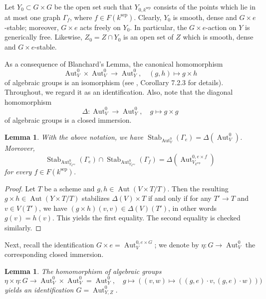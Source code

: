 \documentclass[oneside, 12pt]{amsart}
\newtheorem{lemma}[theorem]{Lemma}
\theoremstyle{definition}
\theoremstyle{remark}
\newcommand{\Aut}{\operatorname{Aut}}
\newcommand{\ra}{\rightarrow}
\newcommand{\sep}{{\operatorname{sep}}}
\newcommand{\Stab}{\operatorname{Stab}}
\begin{document}
Let $Y_0 \subset G \times G$ be the
open set such that $Y_{0,k^{\sep}}$ consists 
of the points which lie in at most one graph 
$\Gamma_f$, where $f \in F(k^{\sep})$. Clearly,
$Y_0$ is smooth, dense and $G \times e$-stable;
moreover, $G \times e$ acts freely on $Y_0$.
In particular, the $G \times e$-action on $Y$
is generically free. Likewise, 
$Z_0 = Z \cap Y_0$ is an open set of $Z$ which
is smooth, dense and $G\times e$-stable.

 
As a consequence of Blanchard's Lemma, the canonical 
homomorphism 
\[ \Aut^0_V \times \Aut^0_V 
\longrightarrow \Aut^0_Y, 
\quad (g,h) \longmapsto g \times h \]
of algebraic groups is an isomorphism
(see \cite{Brion 2017}, Corollary 7.2.3 for details). 
Throughout, we regard it as an identification.
Also, note that the diagonal homomorphism
\[ \Delta : 
\Aut^0_V \longrightarrow \Aut^0_Y, 
 \quad g \longmapsto  g \times g \]
 of algebraic groups is a closed immersion.

\begin{lemma}\label{lem:diag} 
With the above notation, we have
$\Stab_{\Aut^0_Y}(\Gamma_e) = \Delta(\Aut^0_V)$.
Moreover, 
$$
\Stab_{\Aut^0_{Y_{k^{\sep}}}}(\Gamma_e) \cap
\Stab_{\Aut^0_{Y_{k^{\sep}}}}(\Gamma_f)
= \Delta(\Aut^{0,e \times f}_{V_{k^{\sep}}})
$$
for every $f \in F(k^{\sep})$.
\end{lemma}


\begin{proof}
Let $T$ be a scheme and   
$g,h \in \Aut(V \times T/T)$. 
Then  the resulting 
$g \times h \in  \Aut(Y\times T/T)$ stabilizes
$\Delta(V) \times T$ if and only if
for any $T'\ra T$ and $v \in V(T')$, 
we have 
$(g \times h)(v,v) \in \Delta(V)(T')$, in other words $g(v) = h(v)$. This yields the first
equality. The second equality is checked
similarly.
\end{proof}
 
Next, recall the identification $G \times e = \Aut_V^{0,e \times G}$;
we denote by $\eta : G \ra \Aut_V^0$ the corresponding
closed immersion.

\begin{lemma}\label{lem:psipsi}
The homomorphism of algebraic groups
\[ \eta \times \eta : G \longrightarrow 
\Aut^0_V \times \Aut^0_V = \Aut^0_Y, \quad
g \longmapsto ((v,w) \mapsto ((g,e) \cdot v, (g,e) \cdot w)))\]
yields an identification 
$G = \Aut_{Y,Z}^0$.
\end{lemma}
\end{document}

